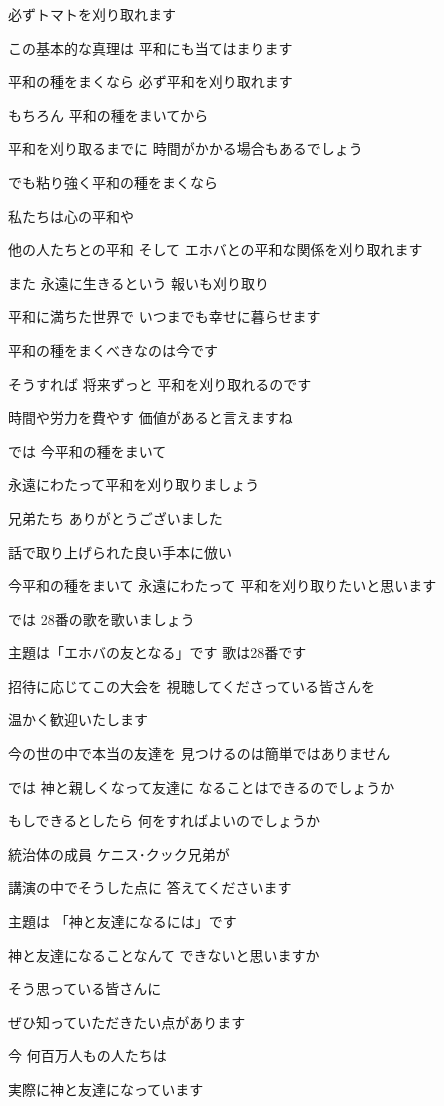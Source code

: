 \documentclass[twocolumn]{jsarticle}
\begin{document}
必ずトマトを刈り取れます

この基本的な真理は
平和にも当てはまります

平和の種をまくなら
必ず平和を刈り取れます

もちろん 平和の種をまいてから

平和を刈り取るまでに
時間がかかる場合もあるでしょう

でも粘り強く平和の種をまくなら

私たちは心の平和や

他の人たちとの平和 そして
エホバとの平和な関係を刈り取れます

また 永遠に生きるという
報いも刈り取り

平和に満ちた世界で
いつまでも幸せに暮らせます

平和の種をまくべきなのは今です

そうすれば 将来ずっと
平和を刈り取れるのです

時間や労力を費やす
価値があると言えますね

では 今平和の種をまいて

永遠にわたって平和を刈り取りましょう

兄弟たち ありがとうございました

話で取り上げられた良い手本に倣い

今平和の種をまいて 永遠にわたって
平和を刈り取りたいと思います

では 28番の歌を歌いましょう

主題は「エホバの友となる」です
歌は28番です

招待に応じてこの大会を
視聴してくださっている皆さんを

温かく歓迎いたします

今の世の中で本当の友達を
見つけるのは簡単ではありません

では 神と親しくなって友達に
なることはできるのでしょうか

もしできるとしたら
何をすればよいのでしょうか

統治体の成員 ケニス･クック兄弟が

講演の中でそうした点に
答えてくださいます

主題は 「神と友達になるには」です

神と友達になることなんて
できないと思いますか

そう思っている皆さんに

ぜひ知っていただきたい点があります

今 何百万人もの人たちは

実際に神と友達になっています
\end{document}
